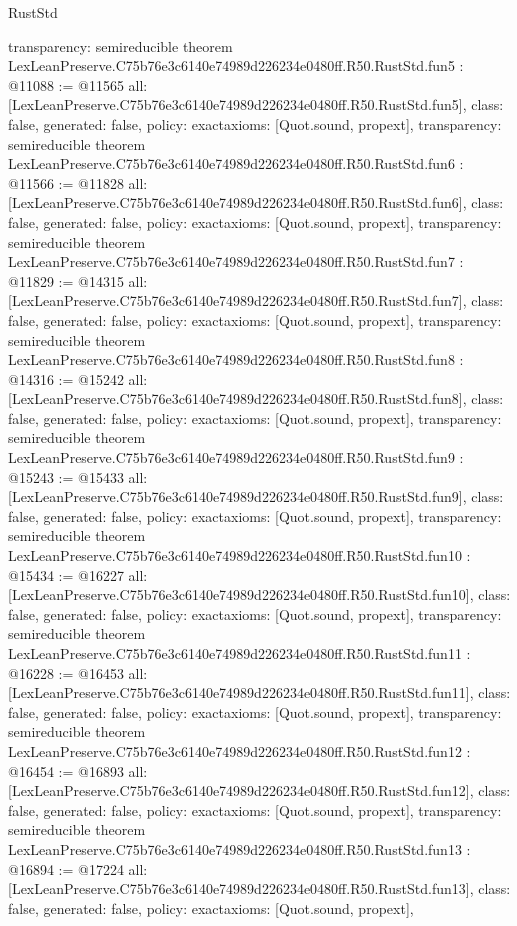 \begin{lexlean}{RustStd}
\begin{coremodule}
{  transparency: semireducible
}
theorem LexLeanPreserve.C75b76e3c6140e74989d226234e0480ff.R50.RustStd.fun5 : @11088 := @11565 {
  all: [LexLeanPreserve.C75b76e3c6140e74989d226234e0480ff.R50.RustStd.fun5],
  class: false,
  generated: false,
  policy: exact{axioms: [Quot.sound, propext]},
  transparency: semireducible
}
theorem LexLeanPreserve.C75b76e3c6140e74989d226234e0480ff.R50.RustStd.fun6 : @11566 := @11828 {
  all: [LexLeanPreserve.C75b76e3c6140e74989d226234e0480ff.R50.RustStd.fun6],
  class: false,
  generated: false,
  policy: exact{axioms: [Quot.sound, propext]},
  transparency: semireducible
}
theorem LexLeanPreserve.C75b76e3c6140e74989d226234e0480ff.R50.RustStd.fun7 : @11829 := @14315 {
  all: [LexLeanPreserve.C75b76e3c6140e74989d226234e0480ff.R50.RustStd.fun7],
  class: false,
  generated: false,
  policy: exact{axioms: [Quot.sound, propext]},
  transparency: semireducible
}
theorem LexLeanPreserve.C75b76e3c6140e74989d226234e0480ff.R50.RustStd.fun8 : @14316 := @15242 {
  all: [LexLeanPreserve.C75b76e3c6140e74989d226234e0480ff.R50.RustStd.fun8],
  class: false,
  generated: false,
  policy: exact{axioms: [Quot.sound, propext]},
  transparency: semireducible
}
theorem LexLeanPreserve.C75b76e3c6140e74989d226234e0480ff.R50.RustStd.fun9 : @15243 := @15433 {
  all: [LexLeanPreserve.C75b76e3c6140e74989d226234e0480ff.R50.RustStd.fun9],
  class: false,
  generated: false,
  policy: exact{axioms: [Quot.sound, propext]},
  transparency: semireducible
}
theorem LexLeanPreserve.C75b76e3c6140e74989d226234e0480ff.R50.RustStd.fun10 : @15434 := @16227 {
  all: [LexLeanPreserve.C75b76e3c6140e74989d226234e0480ff.R50.RustStd.fun10],
  class: false,
  generated: false,
  policy: exact{axioms: [Quot.sound, propext]},
  transparency: semireducible
}
theorem LexLeanPreserve.C75b76e3c6140e74989d226234e0480ff.R50.RustStd.fun11 : @16228 := @16453 {
  all: [LexLeanPreserve.C75b76e3c6140e74989d226234e0480ff.R50.RustStd.fun11],
  class: false,
  generated: false,
  policy: exact{axioms: [Quot.sound, propext]},
  transparency: semireducible
}
theorem LexLeanPreserve.C75b76e3c6140e74989d226234e0480ff.R50.RustStd.fun12 : @16454 := @16893 {
  all: [LexLeanPreserve.C75b76e3c6140e74989d226234e0480ff.R50.RustStd.fun12],
  class: false,
  generated: false,
  policy: exact{axioms: [Quot.sound, propext]},
  transparency: semireducible
}
theorem LexLeanPreserve.C75b76e3c6140e74989d226234e0480ff.R50.RustStd.fun13 : @16894 := @17224 {
  all: [LexLeanPreserve.C75b76e3c6140e74989d226234e0480ff.R50.RustStd.fun13],
  class: false,
  generated: false,
  policy: exact{axioms: [Quot.sound, propext]},
}
\end{coremodule}
\end{lexlean}
